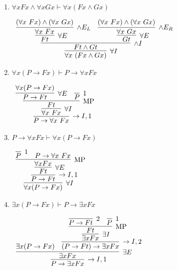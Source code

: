 \documentclass[11pt]{report}
\begin{document}
\begin{enumerate}
\begin{enumerate}
			\item $\forall x Fx\land \forall x Gx \vdash \forall x (Fx\land Gx)$
			
			\begin{center}
				$\begin{array}{c}
					\infer[\forall I]{\forall x \ (Fx \land Gx)}
						{\infer[\land I]{Ft \land Gt}
							{\infer[\forall E]{Ft}
								{\infer[\land E_{L}]{\forall x \ Fx}
									{(\forall x \ Fx) \land (\forall x \ Gx)}}
							&
							\infer[\forall E]{Gt}
								{\infer[\land E_{R}]{\forall x \ Gx}
									{(\forall x \ Fx) \land (\forall x \ Gx)}}}}
				\end{array}$
			\end{center}
			\newpage
			\item $\forall x (P \to Fx) \vdash  P \to \forall x Fx$
			
			\begin{center}
				$\begin{array}{c}
					\infer[\to I,1]{P \to \forall x \ F x}
						{\infer[\forall I]{\forall x \ F x}
							{\infer[\MP]{F t}
								{\infer[\forall E]{P \to F t}
									{\forall x (P \to F x)}
								&
								\infer[1]{P}{}}}}
				\end{array}$
			\end{center}

			\item $P \to \forall x Fx \vdash \forall x (P \to Fx)$
			
			\begin{center}
				$\begin{array}{c}
					\infer[\forall I]{\forall x (P \to F x)}
						{\infer[\to I,1]{P \to F t}
							{\infer[\forall E]{Ft}
								{\infer[\MP]{\forall x F x}
									{\infer[1]{P}{}
									&
									P \to \forall x \ F x}}}}
				\end{array}$
			\end{center}
			
			\item $\exists x (P \to Fx) \vdash  P \to \exists x Fx$
			
			\begin{center}
				$\begin{array}{c}
					\infer[\to I,1]{P \to \exists x F x}
						{\infer[\exists E]{\exists x F x}
							{\exists x (P \to F x)
							&
							\infer[\to I,2]{(P \to F t) \to \exists x F x}
								{\infer[\exists I]{\exists x F x}
									{\infer[\MP]{F t}
										{\infer[2]{P \to F t}{}
										&
										\infer[1]{P}{}}}}}}
				\end{array}$
			\end{center}
			

\end{enumerate}
\end{enumerate}
\end{document}
